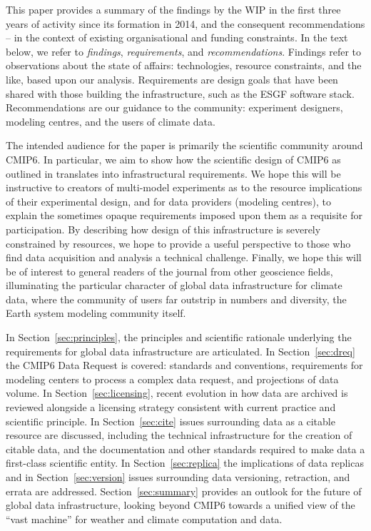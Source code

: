 \documentclass[gmd,manuscript]{copernicus}
\newcommand{\pllabel}[1]{\label{p-#1}\linelabel{l-#1}}
\begin{document}
This paper provides a summary of the findings by the WIP in the first
three years of activity since its formation in 2014, and the
consequent recommendations -- in the context of existing
organisational and funding constraints.
\pllabel{RC1-Overview-2}
In the text below, we refer to \emph{findings}, \emph{requirements},
and \emph{recommendations}. Findings refer to observations about the
state of affairs: technologies, resource constraints, and the like,
based upon our analysis. Requirements are design goals that have been
shared with those building the infrastructure, such as the ESGF
software stack. Recommendations are our guidance to the community:
experiment designers, modeling centres, and the users of climate data.

\pllabel{RC1-Overview-1}
The intended audience for the paper is primarily the scientific
community around CMIP6. In particular, we aim to show how the
scientific design of CMIP6 as outlined in \cite{ref:eyringetal2016a}
translates into infrastructural requirements. We hope this will be
instructive to creators of multi-model experiments as to the resource
implications of their experimental design, and for data providers
(modeling centres), to explain the sometimes opaque requirements imposed
upon them as a requisite for participation. By describing how 
design of this infrastructure is severely constrained by resources, we hope to
provide a useful perspective to  those who find data acquisition and analysis a technical
challenge.   Finally, we hope this will be of
interest to general readers of the journal from other geoscience
fields, illuminating the particular character of global data
infrastructure for climate data, where the community of users far
outstrip in numbers and diversity, the Earth system modeling community
itself.

In Section~\ref{sec:principles}, the principles and scientific
rationale underlying the requirements for global data infrastructure
are articulated. In Section~\ref{sec:dreq} the CMIP6 Data Request is
covered: standards and conventions, requirements for modeling centers
to process a complex data request, and projections of data volume. In
Section~\ref{sec:licensing}, recent evolution in how data are archived
is reviewed alongside a licensing strategy consistent with current
practice and scientific principle. In Section~\ref{sec:cite} issues
surrounding data as a citable resource are discussed, including the
technical infrastructure for the creation of citable data, and the
documentation and other standards required to make data a first-class
scientific entity. In Section~\ref{sec:replica} the implications of
data replicas and in Section~\ref{sec:version} issues surrounding data
versioning, retraction, and errata are addressed.
Section~\ref{sec:summary} provides an outlook for the future of global
data infrastructure, looking beyond CMIP6 towards a unified view of
the ``vast machine'' for weather and climate computation and data.
\end{document}
